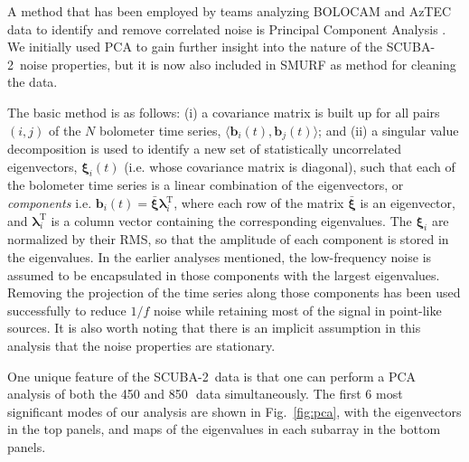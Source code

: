\documentclass[useAMS,usenatbib,nofootinbib]{mn2e}
\newcommand{\scuba}{SCUBA-2}
\newcommand{\rms}{RMS}
\begin{document}
A method that has been employed by teams analyzing BOLOCAM and AzTEC
data to identify and remove correlated noise is Principal Component
Analysis \citep[PCA,][]{laurent2005,scott2008}. We initially used PCA
to gain further insight into the nature of the \scuba\ noise
properties, but it is now also included in SMURF as method for
cleaning the data.

The basic method is as follows: (i) a covariance matrix is built up
for all pairs $(i,j)$ of the $N$ bolometer time series,
$\langle\mathbf{b}_i(t),\mathbf{b}_j(t)\rangle$; and (ii) a singular
value decomposition is used to identify a new set of statistically
uncorrelated eigenvectors, $\mathbf{\xi}_i(t)$ (i.e. whose covariance
matrix is diagonal), such that each of the bolometer time series is a
linear combination of the eigenvectors, or \emph{components}
i.e. $\mathbf{b}_i(t) = \bar{\mathbf{\xi}}
\mathbf{\lambda}_i^\mathrm{T}$, where each row of the matrix
$\bar{\mathbf{\xi}}$ is an eigenvector, and
$\mathbf{\lambda}_i^\mathrm{T}$ is a column vector containing the
corresponding eigenvalues. The $\mathbf{\xi}_i$ are normalized by
their \rms, so that the amplitude of each component is stored in the
eigenvalues. In the earlier analyses mentioned, the low-frequency
noise is assumed to be encapsulated in those components with the
largest eigenvalues. Removing the projection of the time series along
those components has been used successfully to reduce $1/f$ noise
while retaining most of the signal in point-like sources. It is also
worth noting that there is an implicit assumption in this analysis
that the noise properties are stationary.

One unique feature of the \scuba\ data is that one can perform a PCA
analysis of both the 450 and 850\,\micron\ data simultaneously. The
first 6 most significant modes of our analysis are shown in
Fig.~\ref{fig:pca}, with the eigenvectors in the top panels, and maps
of the eigenvalues in each subarray in the bottom panels.
\end{document}
